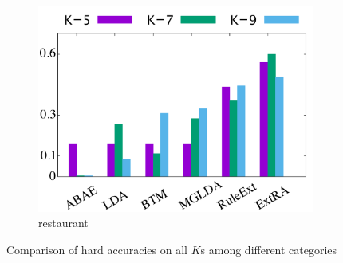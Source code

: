 \begin{figure}[!ht]
\begin{subfigure}{.333\textwidth}
		\includegraphics[width=0.99\linewidth]{figures/restaurant_h}
		\caption{restaurant}
		\label{fig:restaurant_h}
	\end{subfigure}
	
	\caption{Comparison of hard accuracies on all $K$s among different categories }
	\label{fig:comparison_all_h}
\end{figure}


